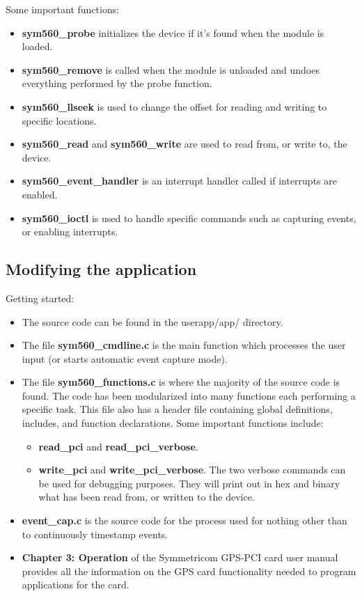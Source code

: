 \documentclass[11pt]{article}
\begin{document}
    Some important functions:
    \begin{itemize}
        \item \textbf{sym560\_probe} initializes the device if it's found when the module is loaded.
        \item \textbf{sym560\_remove} is called when the module is unloaded and undoes everything performed by the probe function.
        \item \textbf{sym560\_llseek} is used to change the offset for reading and writing to specific locations.
        \item \textbf{sym560\_read} and \textbf{sym560\_write} are used to read from, or write to, the device.
        \item \textbf{sym560\_event\_handler} is an interrupt handler called if interrupts are enabled.
        \item \textbf{sym560\_ioctl} is used to handle specific commands such as capturing events, or enabling interrupts.
    \end{itemize}

    \subsection{Modifying the application} \label{modapp}
    Getting started:
    \begin{itemize}
        \item The source code can be found in the userapp/app/ directory.
        \item The file \textbf{sym560\_cmdline.c} is the main function which processes the user input (or starts automatic event capture mode).
        \item The file \textbf{sym560\_functions.c} is where the majority of the source code is found. The code has been modularized into many functions each performing a specific task. This file also has a header file containing global definitions, includes, and function declarations. Some important functions include:
        \begin{itemize}
            \item \textbf{read\_pci} and \textbf{read\_pci\_verbose}.
            \item \textbf{write\_pci} and \textbf{write\_pci\_verbose}. The two verbose commands can be used for debugging purposes. They will print out in hex and binary what has been read from, or written to the device.
        \end{itemize}
        \item \textbf{event\_cap.c} is the source code for the process used for nothing other than to continuously timestamp events.
        \item \textbf{Chapter 3: Operation} of the Symmetricom GPS-PCI card user manual provides all the information on the GPS card functionality needed to program applications for the card.
    \end{itemize}
\end{document}
